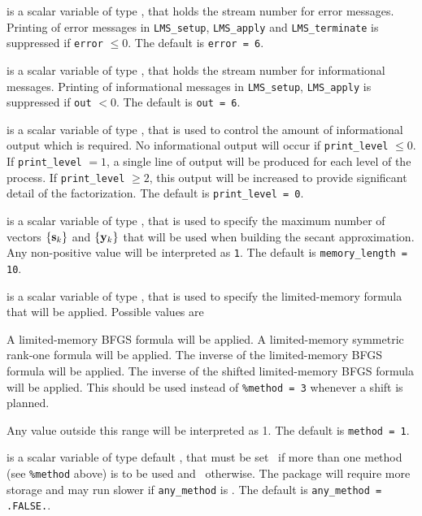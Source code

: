 \documentclass{galahad}
\newcommand{\packagename}{LMS}
\begin{document}
\begin{description}

 is a scalar variable of type \integer, that holds the
stream number for error messages. Printing of error messages in
{\tt \packagename\_setup}, {\tt \packagename\_apply}
and {\tt \packagename\_terminate}
is suppressed if {\tt error} $\leq 0$.
The default is {\tt error = 6}.

 is a scalar variable of type \integer, that holds the
stream number for informational messages. Printing of informational messages in
{\tt \packagename\_setup}, {\tt \packagename\_apply}
is suppressed if {\tt out} $< 0$.
The default is {\tt out = 6}.

 is a scalar variable of type \integer, that is used
to control the amount of informational output which is required. No
informational output will occur if {\tt print\_level} $\leq 0$. If
{\tt print\_level} $= 1$, a single line of output will be produced for each
level of the process. If {\tt print\_level} $\geq 2$, this output will be
increased to provide significant detail of the factorization.
The default is {\tt print\_level = 0}.

 is a scalar variable of type \integer, that is used
to specify the maximum number of vectors  $\{{\mathbf{s}}_k\}$ and $\{{\mathbf{y}}_k\}$
that will be used when building the secant approximation.
Any non-positive value will be interpreted as {\tt 1}.
The default is {\tt memory\_length = 10}.

 is a scalar variable of type \integer, that is used
to specify the limited-memory formula that will be applied. Possible
values are
\begin{description}
 A limited-memory BFGS formula will be applied.
 A limited-memory symmetric rank-one formula will be applied.
 The inverse of the limited-memory BFGS formula will be applied.
 The inverse of the shifted limited-memory BFGS formula will be applied.
This should be used instead of {\tt \%method = 3} whenever a shift is
planned.
\end{description}
Any value outside this range will be interpreted as {1}.
The default is {\tt method = 1}.

 is a scalar variable of type default \logical,
that must be set \true\ if more than one method (see {\tt \%method} above)
is to be used and  \false\ otherwise. The package will require more
storage and may run slower if {\tt any\_method} is \true.
The default is {\tt any\_method = .FALSE.}.


\end{description}
\end{document}
